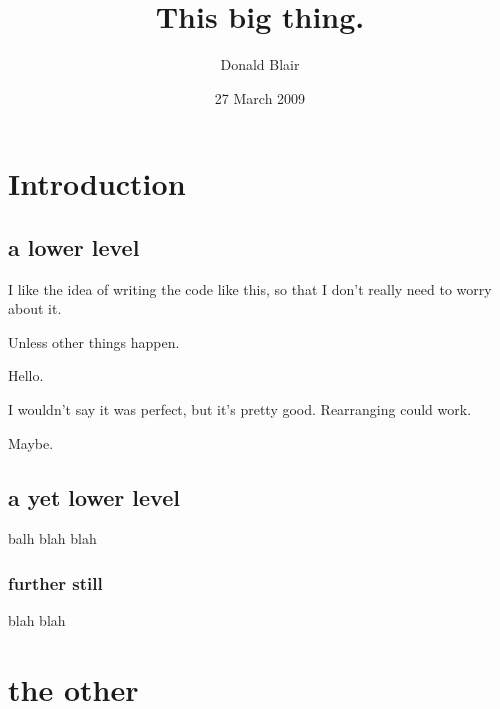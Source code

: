 \documentclass[pre,preprint, 11pt]{revtex4}
\date{27 March 2009}
\begin{document}
\author{Donald Blair}
\title{This big thing.}

\maketitle

\section{Introduction}
\label{sec-1}
\sub
\subsection{a lower level}

I like the idea of writing the code like this, so that I don't really need to worry about it.


Unless other things happen. 

Hello. \cite{AnMa}


I wouldn't say it was perfect, but it's pretty good. Rearranging could work.

Maybe.

 
\subsection{a yet lower level}

balh blah blah
\subsubsection{further still}
blah blah


\section{the other}
\label{sec-2}

%


\end{document}

